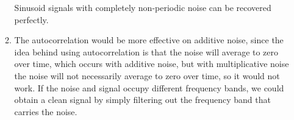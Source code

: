 \begin{enumerate}[label=(\alph*)]
\begin{enumerate}[label=(\roman*)]
        Sinusoid signals with completely non-periodic noise can be recovered perfectly.

      \item
        The autocorrelation would be more effective on additive noise, since the idea behind using autocorrelation is that the noise will average to zero over time, which occurs with additive noise, but with multiplicative noise the noise will not necessarily average to zero over time, so it would not work.
        If the noise and signal occupy different frequency bands, we could obtain a clean signal by simply filtering out the frequency band that carries the noise.
        
    \end{enumerate}
        
\end{enumerate}

